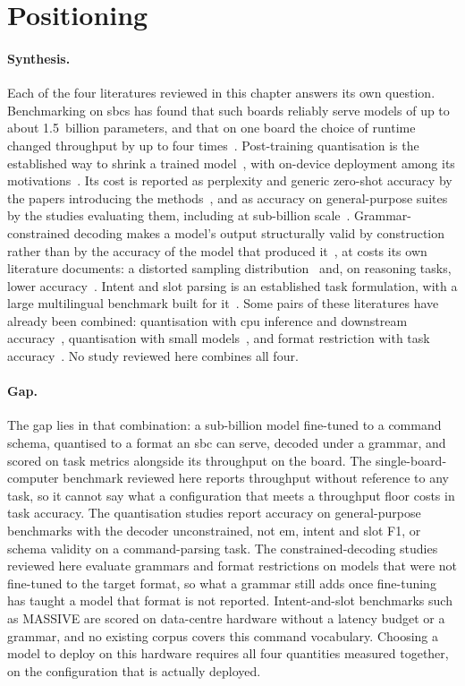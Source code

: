 \section{Positioning}
\label{sec:positioning}

\paragraph{Synthesis.} Each of the four literatures reviewed in this chapter answers its own
question. Benchmarking on \glspl{sbc} has found that such boards reliably serve models of up to
about 1.5~billion parameters, and that on one board the choice of runtime changed throughput by up
to four times~\cite{sbc2025}. Post-training quantisation is the established way to shrink a trained
model~\cite{gptq}, with on-device deployment among its motivations~\cite{awq}. Its cost is reported as perplexity and generic zero-shot accuracy by
the papers introducing the methods~\cite{spqr,gptq}, and as accuracy on general-purpose suites by
the studies evaluating them, including at sub-billion scale~\cite{kurtic2025,kurt2026,slmquant}.
Grammar-constrained decoding makes a model's output structurally valid by construction rather than
by the accuracy of the model that produced it~\cite{willard2023,koo2024}, at costs its own
literature documents: a distorted sampling distribution~\cite{park2024} and, on reasoning tasks,
lower accuracy~\cite{tam2024}. Intent and slot parsing
is an established task formulation, with a large multilingual benchmark built for
it~\cite{massive}. Some pairs of these literatures have already been combined: quantisation with
\gls{cpu} inference and downstream accuracy~\cite{kurt2026}, quantisation with small
models~\cite{slmquant}, and format restriction with task accuracy~\cite{tam2024}. No study
reviewed here combines all four.

\paragraph{Gap.} The gap lies in that combination: a sub-billion model fine-tuned to a command
schema, quantised to a format an \gls{sbc} can serve, decoded under a grammar, and
scored on task metrics alongside its throughput on the board. The single-board-computer benchmark
reviewed here reports throughput without reference to any task, so it cannot say what a
configuration that meets a throughput floor costs in task accuracy. The quantisation studies report
accuracy on general-purpose benchmarks with the decoder unconstrained, not \gls{em}, intent and
slot F1, or schema validity on a command-parsing task. The constrained-decoding studies reviewed here
evaluate grammars and format restrictions on models that were not fine-tuned to the target format, so what a grammar still adds
once fine-tuning has taught a model that format is not reported. Intent-and-slot benchmarks such as
MASSIVE are scored on data-centre hardware without a latency budget or a grammar, and no existing
corpus covers this command vocabulary. Choosing a model to deploy on this hardware requires all
four quantities measured together, on the configuration that is actually deployed.

